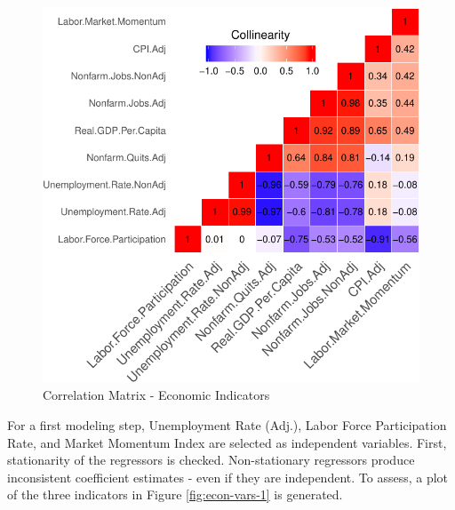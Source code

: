\documentclass[12pt,letterpaper,toc=flat,oneside]{report}
\theoremstyle{definition}
\theoremstyle{definition}
\theoremstyle{definition}
\theoremstyle{remark}
\begin{document}
\begin{figure}[H]

{\centering \includegraphics{elliott-econometric-personnel-retention-18_files/figure-latex/heat-map-1-1} 

}

\caption{Correlation Matrix - Economic Indicators}\label{fig:heat-map-1}
\end{figure}

For a first modeling step, Unemployment Rate (Adj.), Labor Force
Participation Rate, and Market Momentum Index are selected as
independent variables. First, stationarity of the regressors is checked.
Non-stationary regressors produce inconsistent coefficient estimates -
even if they are independent. To assess, a plot of the three indicators
in Figure \ref{fig:econ-vars-1} is generated.
\end{document}
